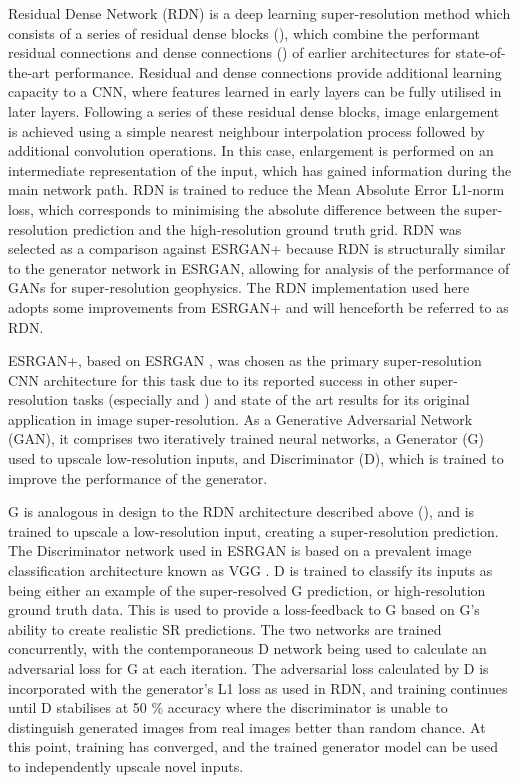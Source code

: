 Residual Dense Network (RDN) \parencite{zhangResidualDenseNetwork2018} is a deep learning super-resolution method which consists of a series of residual dense blocks (), which combine the performant residual connections and dense connections () of earlier architectures for state-of-the-art performance.
Residual and dense connections provide additional learning capacity to a CNN, where features learned in early layers can be fully utilised in later layers.
Following a series of these residual dense blocks, image enlargement is achieved using a simple nearest neighbour interpolation process followed by additional convolution operations.
In this case, enlargement is performed on an intermediate representation of the input, which has gained information during the main network path.
RDN is trained to reduce the Mean Absolute Error L1-norm loss, which corresponds to minimising the absolute difference between the super-resolution prediction and the high-resolution ground truth grid.
RDN was selected as a comparison against ESRGAN+ because RDN is structurally similar to the generator network in ESRGAN, allowing for analysis of the performance of GANs for super-resolution geophysics.
The RDN implementation used here adopts some improvements from ESRGAN+ and will henceforth be referred to as RDN\textdaggerdbl{}.

ESRGAN+, based on ESRGAN \parencite{wangESRGANEnhancedSuperresolution2018}, was chosen as the primary super-resolution CNN architecture for this task due to its reported success in other super-resolution tasks (especially \textcite{bodeUsingPhysicsInformedSuperResolution2019} and \textcite{leongDeepBedMapDeepNeural2020}) and state of the art results for its original application in image super-resolution.
As a Generative Adversarial Network (GAN), it comprises two iteratively trained neural networks, a Generator (G) used to upscale low-resolution inputs, and Discriminator (D), which is trained to improve the performance of the generator.

G is analogous in design to the RDN architecture described above (), and is trained to upscale a low-resolution input, creating a super-resolution prediction.
The Discriminator network used in ESRGAN is based on a prevalent image classification architecture known as VGG \parencite{simonyanVeryDeepConvolutional2015}.
D is trained to classify its inputs as being either an example of the super-resolved G prediction, or high-resolution ground truth data.
This is used to provide a loss-feedback to G based on G's ability to create realistic SR predictions.
The two networks are trained concurrently, with the contemporaneous D network being used to calculate an adversarial loss for G at each iteration.
The adversarial loss calculated by D is incorporated with the generator's L1 loss as used in RDN, and training continues until D stabilises at 50 \% accuracy where the discriminator is unable to distinguish generated images from real images better than random chance.
At this point, training has converged, and the trained generator model can be used to independently upscale novel inputs.

